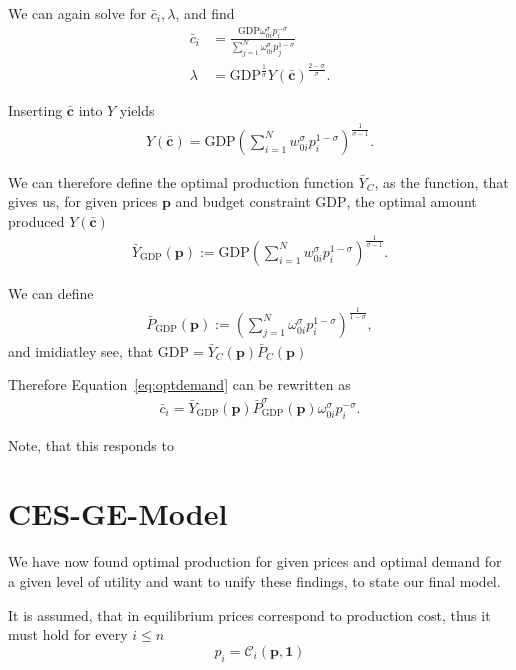 \documentclass{article}
\newcommand{\costf}[1]{\mathscr{C}_#1}
\begin{document}
We can again solve for $\bar c_i,\lambda$, and find
\begin{align*}
  \bar c_i &= \frac {\text{GDP} \omega_{0i}^{\sigma} p_i^{-\sigma}}{\sum_{j=1}^N \omega_{0i}^\sigma p_j^{1- \sigma}} \label{eq:optdemand} \\
  \lambda &= \text{GDP}^{\frac 1 \sigma} Y(\mathbf{\bar c})^{\frac{2-\sigma}{\sigma}}.
\end{align*}

Inserting $\mathbf{\bar c}$ into $Y$ yields
\begin{align*}
  Y(\mathbf{\bar c}) = \text{GDP} \left(\sum_{i=1}^N w_{0i}^\sigma p_i^{1-\sigma} \right)^{\frac{1}{\sigma - 1}}.
\end{align*}

We can therefore define the optimal production function $\bar Y_C$, as the function, that gives us, for given prices $\mathbf p$ and budget constraint $\text{GDP}$, the optimal amount produced $Y(\mathbf{\bar c})$
\begin{align*}
  \bar Y_{\text{GDP}}(\mathbf p) := \text{GDP} \left(\sum_{i=1}^N w_{0i}^\sigma p_i^{1-\sigma} \right)^{\frac{1}{\sigma - 1}}.
\end{align*}

We can define
\begin{align*}
  \bar P_{\text{GDP}}(\mathbf p) := \left( \sum_{j=1}^N \omega_{0i}^\sigma p_i^{1 - \sigma} \right)^{\frac {1}{1 - \sigma}},
\end{align*}
and imidiatley see, that $\text{GDP} = \bar Y_C(\mathbf p)  \bar P_C(\mathbf p)$

Therefore Equation~\eqref{eq:optdemand} can be rewritten as
\begin{align}
  \bar c_i = \bar Y_{\text{GDP}}(\mathbf p) \bar P_{\text{GDP}}^\sigma(\mathbf p) \omega_{0i}^\sigma p_i^{-\sigma}.
\end{align}

Note, that this responds to \parencite[(6)]{HttpBergholtWeebly}

\section{CES-GE-Model}

We have now found optimal production for given prices and optimal demand for a given level of utility and want to unify these findings, to state our final model. 

It is assumed, that in equilibrium prices correspond to production cost, thus it must hold for every $i \leq n$
\begin{equation}
  \label{eq:costequilibrium}
  p_i = \costf{i}(\mathbf p,\mathbf 1)
\end{equation}
\end{document}
